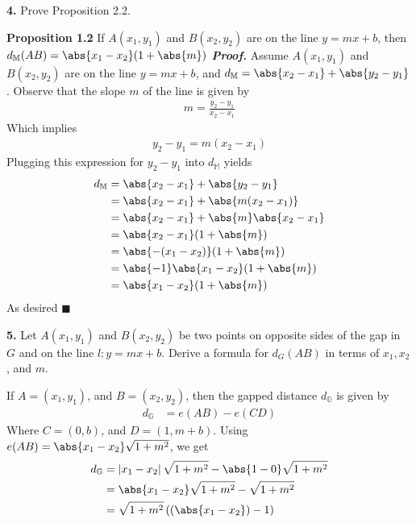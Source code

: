 \documentclass{report}
\begin{document}
    \begin{mdframed}
        \textbf{4.} Prove Proposition 2.2.
    \end{mdframed}
    \bigbreak \noindent 
    \textbf{Proposition 1.2} If $A(x_{1}, y_{1})$ and $B(x_{2}, y_{2}) $ are on the line $y=mx+b$, then $d_{\mathbb{M}}(AB) = \abs{x_{1} - x_{2}}(1+\abs{m})$
    \bigbreak \noindent 
    \textbf{\textit{Proof.}} Assume $A(x_{1}, y_{1})$ and $B(x_{2}, y_{2}) $ are on the line $y=mx+b$, and $d_{\mathbb{M}} = \abs{x_2-x_1} + \abs{y_{2} - y_{1}}$. Observe that the slope $m$ of the line is given by
    \begin{align*}
        m = \frac{y_{2}-y_{1}}{x_{2} - x_{1}}
    \end{align*}
    Which implies 
    \begin{align*}
        y_{2} - y_{1} = m(x_{2} - x_{1})
    \end{align*}
    Plugging this expression for $y_{2} -y_{1}$ into $d_{\mathbb{M}}$ yields
    \begin{align*}
        d_{\mathbb{M}} &= \abs{x_{2} - x_{1}} + \abs{y_{2} - y_{1}} \\
                       &= \abs{x_{2} - x_{1}} + \abs{m(x_{2} - x_{1})} \\
                       &= \abs{x_{2} - x_{1}} + \abs{m}\abs{x_{2} - x_{1}} \\
                       &= \abs{x_{2} - x_{1}}(1 + \abs{m}) \\
                       &= \abs{-(x_{1} - x_{2})} (1 + \abs{m}) \\
                       &= \abs{-1}\abs{x_{1} - x_{2}} (1 + \abs{m}) \\
                       &= \abs{x_{1} - x_{2}} (1 + \abs{m}) \\
    \end{align*}
    As desired \hspace*{\fill} $\blacksquare$

    \begin{mdframed}
        \textbf{5.} Let $A(x_1, y_1)$ and $B(x_2, y_2)$ be two points on opposite sides of the gap in $G$ and on the line $l : y = mx + b$. Derive a formula for $d_G(AB)$ in terms of $x_1, x_2$, and $m$.
    \end{mdframed}
    \bigbreak \noindent 
    If $A = (x_{1}, y_{1})$, and $B = (x_{2}, y_{2})$, then the gapped distance $d_{\mathbb{G}}$ is given by
    \begin{align*}
        d_{\mathbb{G}} &= e(AB) - e(CD)
    \end{align*}
    Where $C = (0, b)$, and $D = (1,m + b)$. Using $e(AB) = \abs{x_{1} - x_{2}}\sqrt{1+m^{2}}$, we get
    \begin{align*}
        d_{\mathbb{G}} &= \left\lvert x_{1} - x_{2} \right\rvert\sqrt{1+m^{2}} - \abs{1-0}\sqrt{1+m^{2}} \\
                       &= \abs{x_{1} - x_{2}} \sqrt{1+m^{2}} - \sqrt{1+m^{2}} \\
                       &= \sqrt{1+m^{2}} \left(\left(\abs{x_{1} - x_{2}}\right) - 1\right)
    \end{align*}






 
\end{document}
